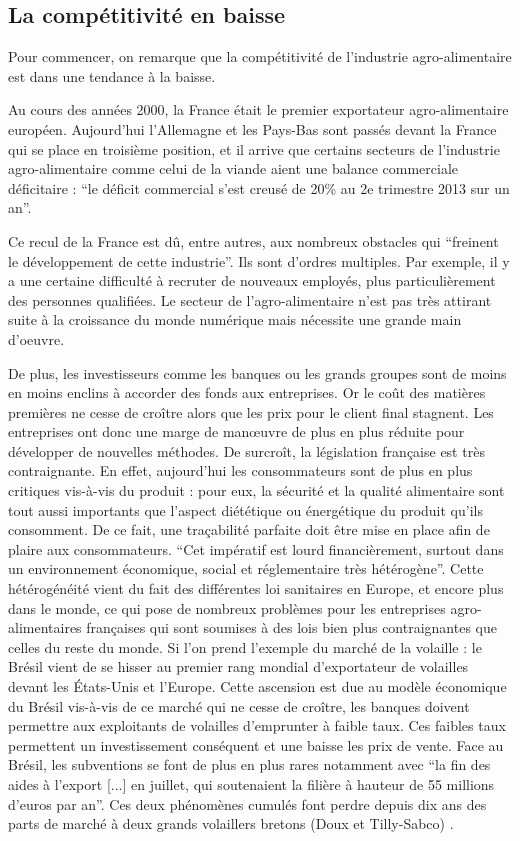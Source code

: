 \documentclass[a4paper,12pt]{report}
\begin{document}
		\subsection{La compétitivité en baisse}
			Pour commencer, on remarque que la compétitivité de l’industrie agro-alimentaire est dans une tendance à la baisse.
			
			Au cours des années 2000, la France était le premier exportateur agro-alimentaire européen. Aujourd'hui l’Allemagne et les Pays-Bas sont passés devant la France qui se place en troisième position, et il arrive que certains secteurs de l’industrie agro-alimentaire comme celui de la viande aient une balance commerciale déficitaire : “le déficit commercial s'est creusé de 20\% au 2e trimestre 2013 sur un an”\cite{DeficitCommercialViandeAggrave}.

			Ce recul de la France est dû, entre autres, aux nombreux obstacles qui “freinent le développement de cette industrie”\cite{StimulerCompetitiviteEntreprises}. Ils sont d’ordres multiples. Par exemple, il y a une certaine difficulté à recruter de nouveaux employés, plus particulièrement des personnes qualifiées. Le secteur de l’agro-alimentaire n’est pas très attirant suite à la croissance du monde numérique mais nécessite une grande main d’oeuvre.

			De plus, les investisseurs comme les banques ou les grands groupes sont de moins en moins enclins à accorder des fonds aux entreprises. Or le coût des matières premières ne cesse de croître alors que les prix pour le client final stagnent. Les entreprises ont donc une marge de manœuvre de plus en plus réduite pour développer de nouvelles méthodes. De surcroît, la législation française est très contraignante. En effet, aujourd’hui les consommateurs sont de plus en plus critiques vis-à-vis du produit : pour eux, la sécurité et la qualité alimentaire sont tout aussi importants que l’aspect diététique ou énergétique du produit qu’ils consomment. De ce fait, une traçabilité parfaite doit être mise en place afin de plaire aux consommateurs. “Cet impératif est lourd financièrement, surtout dans un environnement économique, social et réglementaire très hétérogène”\cite{SecteurAAFrancaisEnjeuxXXISiecle}. Cette hétérogénéité vient du fait des différentes loi sanitaires en Europe, et encore plus dans le monde, ce qui pose de nombreux problèmes pour les entreprises agro-alimentaires françaises qui sont soumises à des lois bien plus contraignantes que celles du reste du monde. Si l’on prend l’exemple du marché de la volaille : le Brésil vient de se hisser au premier rang mondial d’exportateur de volailles devant les États-Unis et l’Europe. Cette ascension est due au modèle économique du Brésil vis-à-vis de ce marché qui ne cesse de croître, les banques doivent permettre aux exploitants de volailles d'emprunter à faible taux. Ces faibles taux permettent un investissement conséquent et une baisse les prix de vente. Face au Brésil, les subventions se font de plus en plus rares notamment avec “la fin des aides à l'export [...] en juillet, qui soutenaient la filière à hauteur de 55 millions d'euros par an”.\cite{PouletBresilienMoinsCherBreton} Ces deux phénomènes cumulés font perdre depuis dix ans des parts de marché à deux grands volaillers bretons (Doux et Tilly-Sabco) .
			
\end{document}
